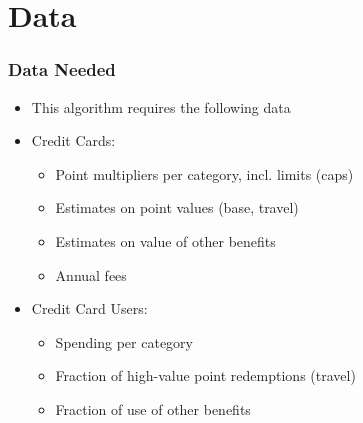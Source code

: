 

\section{Data}

\begin{frame}
    \frametitle{Data Needed}
    \begin{itemize}
        \item This algorithm requires the following data
        \bigskip
        \item Credit Cards:
        \begin{itemize}
            \item Point multipliers per category, incl. limits (caps)
            \item Estimates on point values (base, travel)
            \item Estimates on value of other benefits
            \item Annual fees
        \end{itemize}    
        \bigskip
        \item Credit Card Users:
        \begin{itemize}
            \item Spending per category
            \item Fraction of high-value point redemptions (travel)
            \item Fraction of use of other benefits
        \end{itemize}    
    \end{itemize}
\end{frame}    

